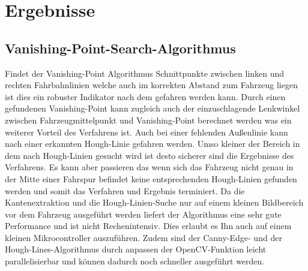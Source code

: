%

\chapter{Ergebnisse}
\label{cha:Ergebnisse} 
%
%




\section{Vanishing-Point-Search-Algorithmus}
\label{section:Vanishing-Point-Search-Algorithmus} 

Findet der Vanishing-Point Algorithmus Schnittpunkte zwischen linken und rechten Fahrbahnlinien welche auch im korrekten Abstand zum Fahrzeug liegen ist dies ein robuster Indikator nach dem gefahren werden kann.
Durch einen gefundenen Vanishing-Point kann zugleich auch der einzuschlagende Lenkwinkel zwischen Fahrzeugmittelpunkt und Vanishing-Point berechnet werden was ein weiterer Vorteil des Verfahrens ist.
Auch bei einer fehlenden Au{\ss}enlinie kann nach einer erkannten Hough-Linie gefahren werden.
Umso kleiner der Bereich in dem nach Hough-Linien gesucht wird ist desto sicherer sind die Ergebnisse des Verfahrens. Es kann aber passieren das wenn sich das Fahrzeug nicht genau in der Mitte einer Fahrspur befindet keine entsprechenden Hough-Linien gefunden werden und somit das Verfahren und Ergebnis terminiert. Da die Kantenextraktion und die Hough-Linien-Suche nur auf einem kleinen Bildbereich vor dem Fahrzeug ausgeführt werden liefert der Algorithmus eine sehr gute Performance und ist nicht Rechenintensiv. Dies erlaubt es Ihn auch auf einem kleinen Mikrocontroller auszuführen. Zudem sind der Canny-Edge- und der Hough-Lines-Algorithmus durch anpassen der OpenCV-Funktion leicht parallelisierbar und können dadurch noch schneller ausgeführt werden.  



